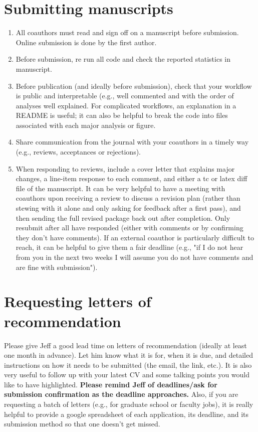 \documentclass[12pt]{article}
\begin{document}
\section{Submitting manuscripts}
\begin{enumerate}
\item All coauthors must read and sign off on a manuscript before
  submission. Online submission is done by the first author.
\item Before submission, re run all code and check the reported statistics in
  manuscript.
\item Before publication (and ideally before submission), check that your workflow is public and interpretable (e.g., well commented and with the order of analyses well explained. For complicated workflows, an explanation in a README is useful; it can also be helpful to break the code into files associated with each major analysis or figure.
\item Share communication from the journal with your coauthors in a timely way (e.g., reviews, acceptances or rejections).
\item When responding to reviews, include a cover letter that explains major changes, a line-item response to each comment, and either a tc or latex diff file of the manuscript. It can be very helpful to have a meeting with coauthors upon receiving a review to discuss a revision plan (rather than stewing with it alone and only asking for feedback after a first pass), and then sending the full revised package back out after completion. Only resubmit after all have responded (either with comments or by confirming they don't have comments). If an external coauthor is particularly difficult to reach, it can be helpful to give them a fair deadline (e.g., "if I do not hear from you in the next two weeks I will assume you do not have comments and are fine with submission").
\end{enumerate}


\section{Requesting letters of recommendation}
Please give Jeff a good lead time on letters of recommendation (ideally at least one month in advance). Let him know what it is for, when it is due, and detailed instructions on how it needs to be submitted (the email, the link, etc.). It is also very useful to follow up with your latest CV and some talking points you would like to have highlighted. \textbf{Please remind Jeff of deadlines/ask for submission confirmation as the deadline approaches.} Also, if you are requesting a batch of letters (e.g., for graduate school or faculty jobs), it is really helpful to provide a google spreadsheet of each application, its deadline, and its submission method so that one doesn't get missed.
\end{document}
